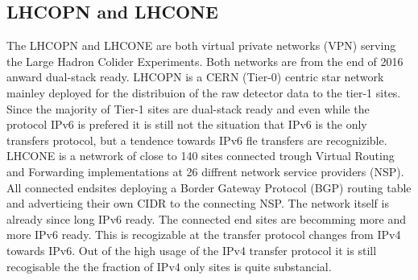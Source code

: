 \subsection{LHCOPN and LHCONE}

The LHCOPN and LHCONE are both virtual private networks (VPN) serving the Large Hadron Colider Experiments. Both networks are from the end of 2016 anward dual-stack ready. LHCOPN is a CERN (Tier-0) centric star network mainley deployed for the distribuion of the raw detector data to the tier-1 sites. Since the majority of Tier-1 sites are dual-stack ready and even while the protocol IPv6 is prefered it is still not the situation that IPv6 is the only transfers protocol, but a tendence towards IPv6 fle transfers are recognizible. LHCONE is a netwrork of close to 140 sites connected trough Virtual Routing and Forwarding implementations at 26 diffrent network service providers (NSP). All connected endsites deploying a Border Gateway Protocol (BGP) routing table and adverticing their own CIDR to the connecting NSP. The network itself is already since long IPv6 ready. The connected end sites are becomming more and more IPv6 ready. This is recogizable at the  transfer protocol changes from IPv4 towards IPv6. Out of the high usage of the IPv4 transfer protocol it is still recogisable the the fraction of IPv4 only sites is quite substancial.
